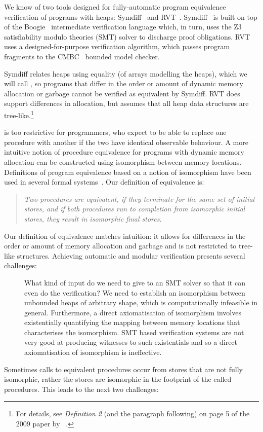 \documentclass[runningheads,a4paper]{llncs}
\begin{document}
We know of two tools designed for fully-automatic program equivalence verification of programs with heaps: Symdiff~\cite{Lahiri2012} and RVT~\cite{Godlin09}. Symdiff~\cite{Kawaguchi2010,Lahiri2012,Lahiri2013,Hawblitzel2013} is built on top of the Boogie~\cite{Barnett2005} intermediate verification language which, in turn, uses the Z3~\cite{DeMoura2008} satisfiability modulo theories (SMT) solver to discharge proof obligations. RVT uses a designed-for-purpose verification algorithm, which passes program fragments to the CMBC~\cite{Clarke2003} bounded model checker.

Symdiff relates heaps using equality (of arrays modelling the heaps), which we will call \emph{\symdiffequivn{}}, so programs that differ in the order or amount of dynamic memory allocation or garbage cannot be verified as equivalent by Symdiff. RVT does support differences in allocation, but assumes that all heap data structures are tree-like.\footnote{For details, see \emph{Definition 2} (and the paragraph following) on page 5 of the 2009 paper by \citeauthor{Godlin09}~\cite{Godlin09}.}

\Symdiffequivn{} is too restrictive for programmers, who expect to be able to replace one procedure with another if the two have identical observable behaviour. A more intuitive notion of procedure equivalence for programs with dynamic memory allocation can be constructed using isomorphism between memory locations. Definitions of program equivalence based on a notion of isomorphism have been used in several formal systems~\cite{Benton2007,Pitts2002}. Our definition of equivalence is:
 \begin{quote}%
 \emph{Two procedures are {\em equivalent}, if they terminate for the same set of initial stores, and if both procedures run to completion from isomorphic initial stores, they result in isomorphic final stores}. 
 \end{quote}
 Our definition of equivalence matches intuition: it allows for differences in the order or amount of memory allocation and garbage and is not restricted to tree-like structures.
Achieving automatic and modular verification presents several challenges:
\begin{description}
\item[\Cone{}]What kind of input do we need to give to an SMT solver so that it can even do the verification? We need to establish an isomorphism between unbounded heaps of arbitrary shape, which is computationally infeasible in general. Furthermore, a direct axiomatisation of isomorphism involves existentially quantifying the mapping between memory locations that characterises the isomorphism. SMT based verification systems are not very good at producing witnesses to such existentials and so a direct axiomatisation of isomorphism is ineffective.
\end{description}
Sometimes calls to equivalent procedures occur from stores that are not fully isomorphic, rather the stores are isomorphic in the footprint of the called procedures. This leads to the next two challenges:
\end{document}
